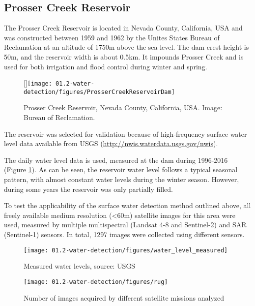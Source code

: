 \subsection{Prosser Creek Reservoir}

The Prosser Creek Reservoir is located in Nevada County, California, USA and was constructed between 1959 and 1962 by the Unites States Bureau of Reclamation at an altitude of 1750m above the sea level. The dam crest height is 50m, and the reservoir width is about 0.5km. It impounds Prosser Creek and is used for both irrigation and flood control during winter and spring. 

\begin{wrapfigure}{r}{0pt}
	\raisebox{0pt}[\dimexpr{}\baselineskip\relax]{\texttt{[image: 01.2-water-detection/figures/ProsserCreekReservoirDam]}}
	\caption{Prosser Creek Reservoir, Nevada County, California, USA. Image: Bureau of Reclamation.}
\end{wrapfigure}

The reservoir was selected for validation because of high-frequency surface water level data available from USGS (\url{http://nwis.waterdata.usgs.gov/nwis}). 

The daily water level data is used, measured at the dam during 1996-2016 (Figure \ref{fig:pc-water-levels}). As can be seen, the reservoir water level follows a typical seasonal pattern, with almost constant water levels during the winter season. However, during some years the reservoir was only partially filled.

To test the applicability of the surface water detection method outlined above, all freely available medium resolution (<60m) satellite images for this area were used, measured by multiple multispectral (Landsat 4-8 and Sentinel-2) and SAR (Sentinel-1) sensors. In total, 1297 images were collected using different sensors.

\begin{figure}[H]
	\centering
	\texttt{[image: 01.2-water-detection/figures/water\_level\_measured]}
	\caption{Measured water levels, source: USGS}
	\label{fig:pc-water-levels}
\end{figure}

\begin{figure}[H]
	\centering
	\texttt{[image: 01.2-water-detection/figures/rug]}
	\caption{Number of images acquired by different satellite missions analyzed}
	\label{fig:pc-n-images}
\end{figure}

